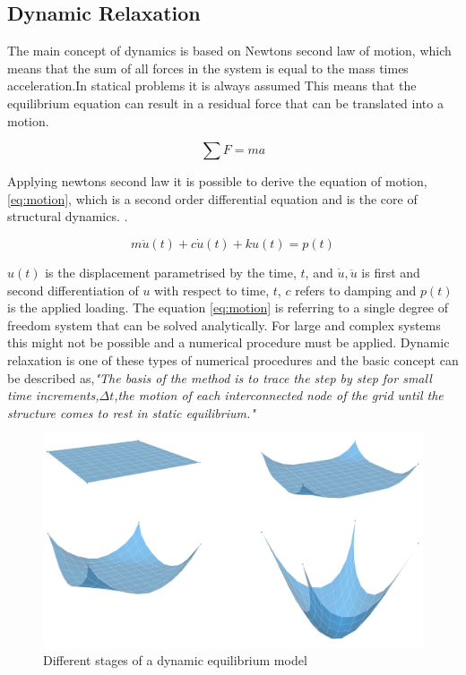\subsection{Dynamic Relaxation}\label{DR}

The main concept of dynamics is based on Newtons second law of motion, which means that the sum of all forces in the system is equal to the mass times acceleration.In statical problems it is always assumed  This means that the equilibrium equation can result in a residual force that can be translated into a motion.

\begin{equation}
\sum F = ma
\end{equation}

Applying newtons second law it is possible to derive the equation of motion, \ref{eq:motion}, which is a second order differential equation and is the core of structural dynamics. \cite{ref:Dynamics}.

\begin{equation} \label{eq:motion}
 m\ddot{u}(t) + c\dot{u}(t) + ku(t) = p(t)
\end{equation}


$u(t)$ is the displacement parametrised by the time, $t$, and $\dot{u},\ddot{u}$ is first and second differentiation of $u$ with respect to time, $t$, $c$ refers to damping and $p(t)$ is the applied loading. The equation \ref{eq:motion} is referring to a single degree of freedom system that can be solved analytically. For large and complex systems this might not be possible and a numerical procedure must be applied. Dynamic relaxation is one of these types of numerical procedures and the basic concept can be described as,\textit{"The basis of the method is to trace the step by step for small time increments,$\Delta t$,the motion of each interconnected node of the grid until the structure comes to rest in static equilibrium."} \cite{ref:ShellOpt}


\begin{figure}[H] 
\centering
\includegraphics[width=0.8\linewidth ]{figure/Theory/PartSpring.jpg}
\caption{Different stages of a dynamic equilibrium model }
\label{fig:DR}
\end{figure}

